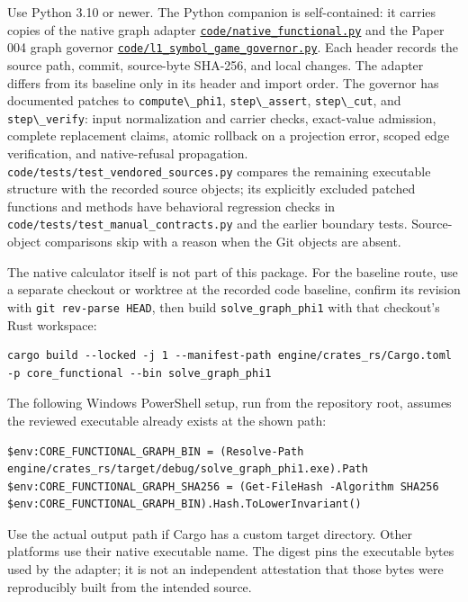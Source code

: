 \documentclass[
  11pt,
]{article}
\newcommand{\passthrough}[1]{#1}
\begin{document}
Use Python 3.10 or newer. The Python companion is self-contained: it
carries copies of the native graph adapter
\href{code/native_functional.py}{\nolinkurl{code/native_functional.py}}
and the Paper 004 graph governor
\href{code/l1_symbol_game_governor.py}{\nolinkurl{code/l1_symbol_game_governor.py}}.
Each header records the source path, commit, source-byte SHA-256, and
local changes. The adapter differs from its baseline only in its header
and import order. The governor has documented patches to
\passthrough{\lstinline!compute\_phi1!},
\passthrough{\lstinline!step\_assert!},
\passthrough{\lstinline!step\_cut!}, and
\passthrough{\lstinline!step\_verify!}: input normalization and carrier
checks, exact-value admission, complete replacement claims, atomic
rollback on a projection error, scoped edge verification, and
native-refusal propagation.
\nolinkurl{code/tests/test_vendored_sources.py} compares the remaining
executable structure with the recorded source objects; its explicitly
excluded patched functions and methods have behavioral regression checks
in \nolinkurl{code/tests/test_manual_contracts.py} and the earlier
boundary tests. Source-object comparisons skip with a reason when the
Git objects are absent.

The native calculator itself is not part of this package. For the
baseline route, use a separate checkout or worktree at the recorded code
baseline, confirm its revision with
\passthrough{\lstinline!git rev-parse HEAD!}, then build
\nolinkurl{solve_graph_phi1} with that checkout's Rust workspace:

\begin{lstlisting}
cargo build --locked -j 1 --manifest-path engine/crates_rs/Cargo.toml -p core_functional --bin solve_graph_phi1
\end{lstlisting}

The following Windows PowerShell setup, run from the repository root,
assumes the reviewed executable already exists at the shown path:

\begin{lstlisting}
$env:CORE_FUNCTIONAL_GRAPH_BIN = (Resolve-Path engine/crates_rs/target/debug/solve_graph_phi1.exe).Path
$env:CORE_FUNCTIONAL_GRAPH_SHA256 = (Get-FileHash -Algorithm SHA256 $env:CORE_FUNCTIONAL_GRAPH_BIN).Hash.ToLowerInvariant()
\end{lstlisting}

Use the actual output path if Cargo has a custom target directory. Other
platforms use their native executable name. The digest pins the
executable bytes used by the adapter; it is not an independent
attestation that those bytes were reproducibly built from the intended
source.
\end{document}
